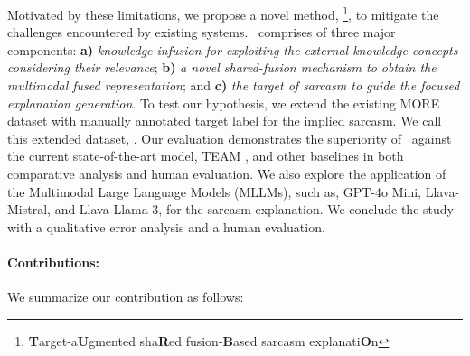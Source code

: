 Motivated by these limitations, we propose a novel method, \model\footnote{\textbf{T}arget-a\textbf{U}gmented sha\textbf{R}ed fusion-\textbf{B}ased sarcasm explanati\textbf{O}n}, to mitigate the challenges encountered by existing systems. \model\ comprises of three major components: \textbf{a)} \textit{knowledge-infusion for exploiting the external knowledge concepts considering their relevance}; \textbf{b)} \textit{a novel shared-fusion mechanism to obtain the multimodal fused representation}; and \textbf{c)} \textit{the target of sarcasm to guide the focused explanation generation}. To test our hypothesis, we extend the existing MORE dataset \cite{Desai_Chakraborty_Akhtar_2022} with manually annotated target label for the implied sarcasm. We call this extended dataset, \dataset. Our evaluation demonstrates the superiority of \model\ against the current state-of-the-art model, TEAM \cite{jing-etal-2023-multi}, and other baselines in both comparative analysis and human evaluation. We also explore the application of the Multimodal Large Language Models (MLLMs), such as, GPT-4o Mini, Llava-Mistral, and Llava-Llama-3, for the sarcasm explanation. We conclude the study with a qualitative error analysis and a human evaluation.



\paragraph{Contributions:} We summarize our contribution as follows: 

